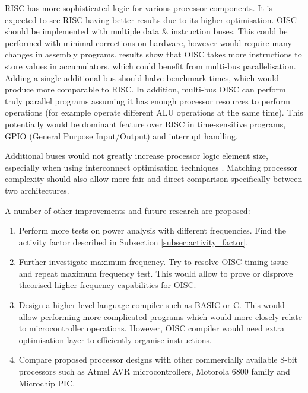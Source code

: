 RISC has more sophisticated logic for various processor components. It is expected to see RISC having better results due to its higher optimisation. OISC should be implemented with multiple data \& instruction buses. This could be performed with minimal corrections on hardware, however would require many changes in assembly programs.  results show that OISC takes more instructions to store values in accumulators, which could benefit from multi-bus parallelisation. Adding a single additional bus should halve benchmark times, which would produce more comparable to RISC. In addition, multi-bus OISC can perform truly parallel programs assuming it has enough processor resources to perform operations (for example operate different ALU operations at the same time). This potentially would be dominant feature over RISC in time-sensitive programs, GPIO (General Purpose Input/Output) and interrupt handling. 

Additional buses would not greatly increase processor logic element size, especially when using interconnect optimisation techniques \autocite{1207041,6972455}. Matching processor complexity should also allow more fair and direct comparison specifically between two architectures. 

A number of other improvements and future research are proposed:
\begin{enumerate}
	\item Perform more tests on power analysis with different frequencies. Find the activity factor described in Subsection \ref{subsec:activity_factor}.
	\item Further investigate maximum frequency. Try to resolve OISC timing issue and repeat maximum frequency test. This would allow to prove or disprove theorised higher frequency capabilities for OISC. 
	\item Design a higher level language compiler such as BASIC or C. This would allow performing more complicated programs which would more closely relate to microcontroller operations. However, OISC compiler would need extra optimisation layer to efficiently organise instructions.
	\item Compare proposed processor designs with other commercially available 8-bit processors such as Atmel AVR microcontrollers, Motorola 6800 family and Microchip PIC.
\end{enumerate}

